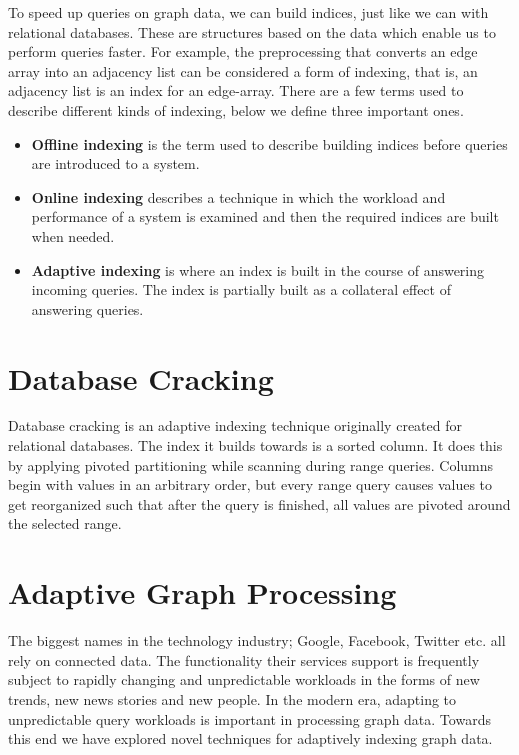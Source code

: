 To speed up queries on graph data, we can build indices, just like we can with relational databases. These are structures based on the data which enable us to perform queries faster. For example, the preprocessing that converts an edge array into an adjacency list can be considered a form of indexing, that is, an adjacency list is an  index for an edge-array. There are a few terms used to describe different kinds of indexing, below we define three important ones.

\begin{itemize}
\item \textbf{Offline indexing} is the term used to describe building indices before queries are introduced to a system.
\item \textbf{Online indexing} describes a technique in which the workload and performance of a system is examined and then the required indices are built when needed.
\item \textbf{Adaptive indexing} is where an index is built in the course of answering incoming queries. The index is partially built as a collateral effect of answering queries.
\end{itemize}

\section{Database Cracking}

Database cracking is an adaptive indexing technique originally created for relational databases. The index it builds towards is a sorted column. It does this by applying pivoted partitioning while scanning during range queries. Columns begin with values in an arbitrary order, but every range query causes values to get reorganized such that after the query is finished, all values are pivoted around the selected range.

\section{Adaptive Graph Processing}

The biggest names in the technology industry; Google, Facebook, Twitter etc. all rely on connected data. The functionality their services support is frequently subject to rapidly changing and unpredictable workloads in the forms of new trends, new news stories and new people. In the modern era, adapting to unpredictable query workloads is important in processing graph data. Towards this end we have explored novel techniques for adaptively indexing graph data.

